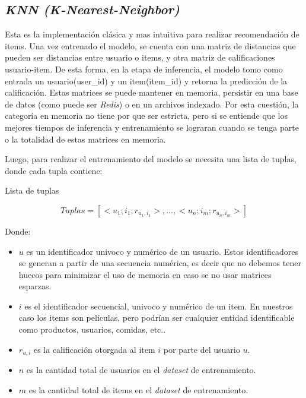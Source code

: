 \documentclass[11pt,a4paper,twoside]{thesis}
\begin{document}
\subsection{\textit{KNN (K-Nearest-Neighbor)}}

Esta es la implementación clásica y mas intuitiva para realizar recomendación de items. Una vez entrenado el modelo, se cuenta con una matriz de distancias que pueden ser distancias entre usuario o items, y otra matriz de calificaciones usuario-item. De esta forma, en la etapa de inferencia, el modelo tomo como entrada un usuario(user\_id) y un item(item\_id) y retorna la predicción de la calificación. Estas matrices se puede mantener en memoria, persistir en una base de datos (como puede ser \textit{Redis}) o en un archivos indexado. Por esta cuestión, la categoría en memoria no tiene por que ser estricta, pero si se entiende que los mejores tiempos de inferencia y entrenamiento se lograran cuando se tenga parte o la totalidad de estas matrices en memoria. 

\clearpage
Luego, para realizar el entrenamiento del modelo se necesita una lista de tuplas, donde cada tupla contiene:

\begin{description}
	\item[Lista de tuplas]
\end{description}
\begin{equation}
	Tuplas = [<u_1; i_1; r_{u_1, i_1}>,...,<u_n; i_m; r_{u_n, i_m}>]
\end{equation}
\begin{description}
	\item[Donde:]
\end{description}
\begin{itemize}
	\item $u$ es un identificador univoco y numérico de un usuario. Estos identificadores se generan a partir de una secuencia numérica, es decir que no debemos tener huecos para minimizar el uso de memoria en caso se no usar matrices esparzas. 
	\item $i$ es el identificador secuencial, univoco y numérico de un item. En nuestros caso los items son películas, pero podrían ser cualquier entidad identificable como productos, usuarios, comidas, etc.. 
	\item $r_{u, i}$ es la calificación otorgada al item $i$ por parte del usuario $u$. 
 	\item $n$ es la cantidad total de usuarios en el \textit{dataset} de entrenamiento. 
  	\item $m$ es la cantidad total de items en el \textit{dataset} de entrenamiento. 
\end{itemize}
\end{document}
